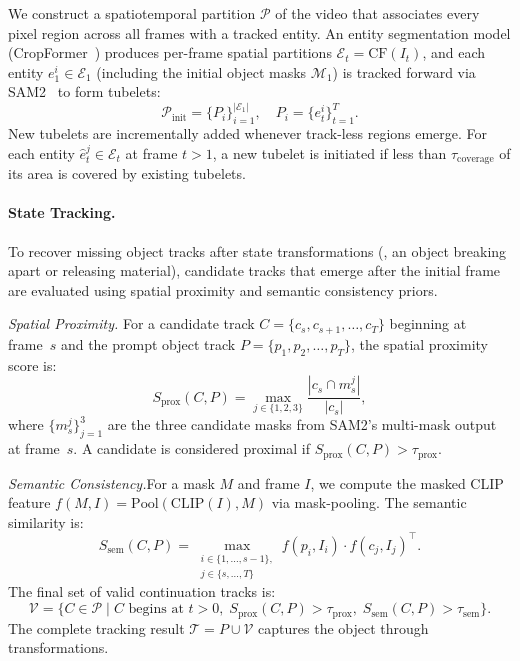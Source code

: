 \documentclass[runningheads]{llncs}
\begin{document}
We construct a spatiotemporal partition $\mathcal{P}$ of the video that associates every pixel region across all frames with a tracked entity. An entity segmentation model (CropFormer~\cite{qi2022high}) produces per-frame spatial partitions $\mathcal{E}_t = \mathrm{CF}(I_t)$, and each entity $e_1^i \in \mathcal{E}_1$ (including the initial object masks $\mathcal{M}_1$) is tracked forward via SAM2~\cite{ravi2024sam2} to form tubelets:
%
\begin{equation}
    \label{eq:partition}
    \mathcal{P}_\text{init} = \{P_i\}_{i=1}^{|\mathcal{E}_1|}, \quad P_i = \{e_t^i\}_{t=1}^{T}.
\end{equation}
%
New tubelets are incrementally added whenever track-less regions emerge. For each entity $\hat{e}_t^j \in \mathcal{E}_t$ at frame $t > 1$, a new tubelet is initiated if less than $\tau_\text{coverage}$ of its area is covered by existing tubelets.


\paragraph{\textbf{State Tracking.}}

To recover missing object tracks after state transformations (\eg, an object breaking apart or releasing material), candidate tracks that emerge after the initial frame are evaluated using spatial proximity and semantic consistency priors.

\textit{Spatial Proximity.} For a candidate track $C = \{c_s, c_{s+1}, \ldots, c_T\}$ beginning at frame~$s$ and the prompt object track $P = \{p_1, p_2, \ldots, p_T\}$, the spatial proximity score is:
%
\begin{equation}
    S_\text{prox}(C, P) = \max_{j \in \{1,2,3\}} \frac{|c_s \cap m_s^j|}{|c_s|},
\end{equation}
%
where $\{m_s^j\}_{j=1}^{3}$ are the three candidate masks from SAM2's multi-mask output at frame~$s$. A candidate is considered proximal if $S_\text{prox}(C, P) > \tau_\text{prox}$.

\textit{Semantic Consistency.}\quad For a mask $M$ and frame $I$, we compute the masked CLIP~\cite{radford2021clip} feature $f(M, I) = \mathrm{Pool}(\mathrm{CLIP}(I), M)$ via mask-pooling. The semantic similarity is:
%
\begin{equation}
    S_\text{sem}(C, P) = \max_{\substack{i \in \{1,\ldots,s{-}1\},\\ j \in \{s,\ldots,T\}}} f(p_i, I_i) \cdot f(c_j, I_j)^\top.
\end{equation}
%
The final set of valid continuation tracks is:
%
\begin{equation}
    \mathcal{V} = \{C \in \mathcal{P} \mid C \text{ begins at } t > 0,\; S_\text{prox}(C, P) > \tau_\text{prox},\; S_\text{sem}(C, P) > \tau_\text{sem}\}.
\end{equation}
%
The complete tracking result $\mathcal{T} = P \cup \mathcal{V}$ captures the object through transformations.
\end{document}
